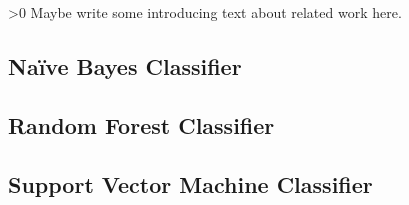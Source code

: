 \ifnum\printdraft>0
	Maybe write some introducing text about related work here.
\fi
\subsection{Naïve Bayes Classifier}

\subsection{Random Forest Classifier}

\subsection{Support Vector Machine Classifier}

